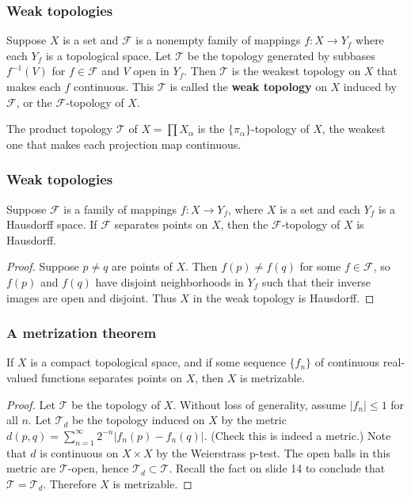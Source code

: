 \documentclass{beamer}
\begin{document}
\begin{frame}
\frametitle{Weak topologies}
\begin{Definition}
    Suppose $X$ is a set and $\mathcal{F}$ is a nonempty family of mappings $f: X \to Y_f$ where each $Y_f$ is a topological space. Let $\mathcal{T}$ be the topology generated by subbases $f^{-1}(V)$ for $f \in \mathcal{F}$ and $V$ open in $Y_f$. Then $\mathcal{T}$ is the weakest topology on $X$ that makes each $f$ continuous. This $\mathcal{T}$ is called the \textbf{weak topology} on $X$ induced by $\mathcal{F}$, or the $\mathcal{F}$-topology of $X$.
\end{Definition}
\begin{example}
    The product topology $\mathcal{T}$ of $X = \prod X_\alpha$ is the $\{\pi_\alpha\}$-topology of $X$, the weakest one that makes each projection map continuous.
\end{example}
\end{frame}
\begin{frame}
\frametitle{Weak topologies}
\begin{fact}
    Suppose $\mathcal{F}$ is a family of mappings $f:X \to Y_f$, where $X$ is a set and each $Y_f$ is a Hausdorff space. If $\mathcal{F}$ separates points on $X$, then the $\mathcal{F}$-topology of $X$ is Hausdorff.
\end{fact}
\begin{proof}
    Suppose $p \neq q$ are points of $X$. Then $f(p) \neq f(q)$ for some $f \in \mathcal{F}$, so $f(p)$ and $f(q)$ have disjoint neighborhoods in $Y_f$ such that their inverse images are open and disjoint. Thus $X$ in the weak topology is Hausdorff.
\end{proof}
\end{frame}
\begin{frame}
\frametitle{A metrization theorem}
\begin{theorem}
    If $X$ is a compact topological space, and if some sequence $\{f_n\}$ of continuous real-valued functions separates points on $X$, then $X$ is metrizable.
\end{theorem}
\begin{proof}
    Let $\mathcal{T}$ be the topology of $X$. Without loss of generality, assume $|f_n|\leq 1$ for all $n$. Let $\mathcal{T}_d$ be the topology induced on $X$ by the metric $d(p,q) = \sum_{n=1}^\infty 2^{-n}|f_n(p)-f_n(q)|$. (Check this is indeed a metric.) Note that $d$ is continuous on $X\times X$ by the Weierstrass p-test. The open balls in this metric are $\mathcal{T}$-open, hence $\mathcal{T}_d \subset \mathcal{T}$. Recall the fact on slide 14 to conclude that $\mathcal{T} = \mathcal{T}_d$. Therefore $X$ is metrizable.
\end{proof}
\end{frame}
\end{document}

